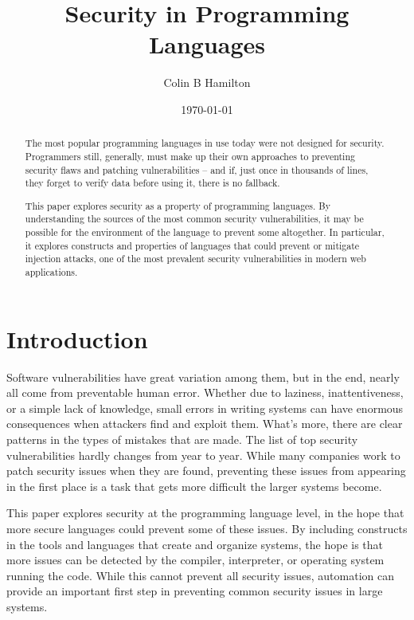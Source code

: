 \documentclass[twocolumn]{article}
\begin{document}
\title{Security in Programming Languages}
\author{Colin B Hamilton}
\date{\today}
\maketitle

\begin{abstract}
The most popular programming languages in use today were not designed for security.  Programmers still, generally, must make up their own approaches to preventing security flaws and patching vulnerabilities – and if, just once in thousands of lines, they forget to verify data before using it, there is no fallback.

This paper explores security as a property of programming languages.  By understanding the sources of the most common security vulnerabilities, it may be possible for the environment of the language to prevent some altogether.  In particular, it explores constructs and properties of languages that could prevent or mitigate injection attacks, one of the most prevalent security vulnerabilities in modern web applications.
\end{abstract}


\section{Introduction}
Software vulnerabilities have great variation among them, but in the end, nearly all come from preventable human error.  Whether due to laziness, inattentiveness, or a simple lack of knowledge, small errors in writing systems can have enormous consequences when attackers find and exploit them.  What's more, there are clear patterns in the types of mistakes that are made.  The list of top security vulnerabilities hardly changes from year to year.  While many companies work to patch security issues when they are found, preventing these issues from appearing in the first place is a task that gets more difficult the larger systems become.

This paper explores security at the programming language level, in the hope that more secure languages could prevent some of these issues.  By including constructs in the tools and languages that create and organize systems, the hope is that more issues can be detected by the compiler, interpreter, or operating system running the code.  While this cannot prevent all security issues, automation can provide an important first step in preventing common security issues in large systems.
\end{document}

